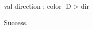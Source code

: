 \chklistingtrue
{}
\begin{ChkListingMsg}
val direction : color -D-> dir 
\end{ChkListingMsg}
\begin{ChkListingErr}
Success.
\end{ChkListingErr}
